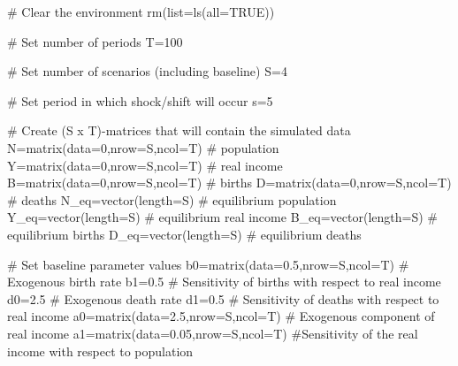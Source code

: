 \documentclass[
  letterpaper,
  DIV=11,
  numbers=noendperiod]{scrreprt}
\newenvironment{Shaded}{\begin{snugshade}}{\end{snugshade}}
\newcommand{\AttributeTok}[1]{\textcolor[rgb]{0.40,0.45,0.13}{#1}}
\newcommand{\CommentTok}[1]{\textcolor[rgb]{0.37,0.37,0.37}{#1}}
\newcommand{\ConstantTok}[1]{\textcolor[rgb]{0.56,0.35,0.01}{#1}}
\newcommand{\DecValTok}[1]{\textcolor[rgb]{0.68,0.00,0.00}{#1}}
\newcommand{\FloatTok}[1]{\textcolor[rgb]{0.68,0.00,0.00}{#1}}
\newcommand{\FunctionTok}[1]{\textcolor[rgb]{0.28,0.35,0.67}{#1}}
\newcommand{\NormalTok}[1]{\textcolor[rgb]{0.00,0.23,0.31}{#1}}
\newcommand{\OtherTok}[1]{\textcolor[rgb]{0.00,0.23,0.31}{#1}}
\begin{document}
\begin{Shaded}
\begin{Highlighting}[]
\CommentTok{\# Clear the environment}
\FunctionTok{rm}\NormalTok{(}\AttributeTok{list=}\FunctionTok{ls}\NormalTok{(}\AttributeTok{all=}\ConstantTok{TRUE}\NormalTok{))}

\CommentTok{\# Set number of periods}
\NormalTok{T}\OtherTok{=}\DecValTok{100}

\CommentTok{\# Set number of scenarios (including baseline)}
\NormalTok{S}\OtherTok{=}\DecValTok{4}

\CommentTok{\# Set period in which shock/shift will occur}
\NormalTok{s}\OtherTok{=}\DecValTok{5}

\CommentTok{\# Create (S x T){-}matrices that will contain the simulated data}
\NormalTok{N}\OtherTok{=}\FunctionTok{matrix}\NormalTok{(}\AttributeTok{data=}\DecValTok{0}\NormalTok{,}\AttributeTok{nrow=}\NormalTok{S,}\AttributeTok{ncol=}\NormalTok{T) }\CommentTok{\# population}
\NormalTok{Y}\OtherTok{=}\FunctionTok{matrix}\NormalTok{(}\AttributeTok{data=}\DecValTok{0}\NormalTok{,}\AttributeTok{nrow=}\NormalTok{S,}\AttributeTok{ncol=}\NormalTok{T) }\CommentTok{\# real income}
\NormalTok{B}\OtherTok{=}\FunctionTok{matrix}\NormalTok{(}\AttributeTok{data=}\DecValTok{0}\NormalTok{,}\AttributeTok{nrow=}\NormalTok{S,}\AttributeTok{ncol=}\NormalTok{T) }\CommentTok{\# births}
\NormalTok{D}\OtherTok{=}\FunctionTok{matrix}\NormalTok{(}\AttributeTok{data=}\DecValTok{0}\NormalTok{,}\AttributeTok{nrow=}\NormalTok{S,}\AttributeTok{ncol=}\NormalTok{T) }\CommentTok{\# deaths}
\NormalTok{N\_eq}\OtherTok{=}\FunctionTok{vector}\NormalTok{(}\AttributeTok{length=}\NormalTok{S)          }\CommentTok{\# equilibrium population}
\NormalTok{Y\_eq}\OtherTok{=}\FunctionTok{vector}\NormalTok{(}\AttributeTok{length=}\NormalTok{S)          }\CommentTok{\# equilibrium real income}
\NormalTok{B\_eq}\OtherTok{=}\FunctionTok{vector}\NormalTok{(}\AttributeTok{length=}\NormalTok{S)          }\CommentTok{\# equilibrium births}
\NormalTok{D\_eq}\OtherTok{=}\FunctionTok{vector}\NormalTok{(}\AttributeTok{length=}\NormalTok{S)          }\CommentTok{\# equilibrium deaths}

\CommentTok{\# Set baseline parameter values}
\NormalTok{b0}\OtherTok{=}\FunctionTok{matrix}\NormalTok{(}\AttributeTok{data=}\FloatTok{0.5}\NormalTok{,}\AttributeTok{nrow=}\NormalTok{S,}\AttributeTok{ncol=}\NormalTok{T) }\CommentTok{\# Exogenous birth rate}
\NormalTok{b1}\OtherTok{=}\FloatTok{0.5} \CommentTok{\# Sensitivity of births with respect to real income}
\NormalTok{d0}\OtherTok{=}\FloatTok{2.5} \CommentTok{\# Exogenous death rate}
\NormalTok{d1}\OtherTok{=}\FloatTok{0.5} \CommentTok{\# Sensitivity of deaths with respect to real income}
\NormalTok{a0}\OtherTok{=}\FunctionTok{matrix}\NormalTok{(}\AttributeTok{data=}\FloatTok{2.5}\NormalTok{,}\AttributeTok{nrow=}\NormalTok{S,}\AttributeTok{ncol=}\NormalTok{T) }\CommentTok{\# Exogenous component of real income }
\NormalTok{a1}\OtherTok{=}\FunctionTok{matrix}\NormalTok{(}\AttributeTok{data=}\FloatTok{0.05}\NormalTok{,}\AttributeTok{nrow=}\NormalTok{S,}\AttributeTok{ncol=}\NormalTok{T) }\CommentTok{\#Sensitivity of the real income with respect to population}


\end{Highlighting}
\end{Shaded}
\end{document}
